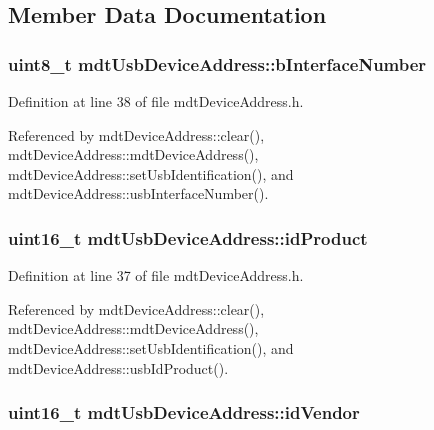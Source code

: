 \subsection{Member Data Documentation}
\hypertarget{structmdt_usb_device_address_ac599e57df4f2a44e8c62791d1e5e5600}{
\subsubsection[{b\-Interface\-Number}]{\setlength{\rightskip}{0pt plus 5cm}uint8\-\_\-t mdt\-Usb\-Device\-Address\-::b\-Interface\-Number}}\label{structmdt_usb_device_address_ac599e57df4f2a44e8c62791d1e5e5600}


Definition at line 38 of file mdt\-Device\-Address.\-h.



Referenced by mdt\-Device\-Address\-::clear(), mdt\-Device\-Address\-::mdt\-Device\-Address(), mdt\-Device\-Address\-::set\-Usb\-Identification(), and mdt\-Device\-Address\-::usb\-Interface\-Number().

\hypertarget{structmdt_usb_device_address_aade64f7cb76af63da7cb493cebd614f2}{
\subsubsection[{id\-Product}]{\setlength{\rightskip}{0pt plus 5cm}uint16\-\_\-t mdt\-Usb\-Device\-Address\-::id\-Product}}\label{structmdt_usb_device_address_aade64f7cb76af63da7cb493cebd614f2}


Definition at line 37 of file mdt\-Device\-Address.\-h.



Referenced by mdt\-Device\-Address\-::clear(), mdt\-Device\-Address\-::mdt\-Device\-Address(), mdt\-Device\-Address\-::set\-Usb\-Identification(), and mdt\-Device\-Address\-::usb\-Id\-Product().

\hypertarget{structmdt_usb_device_address_a7995bcabee1715f7e209edfc623f7a55}{
\subsubsection[{id\-Vendor}]{\setlength{\rightskip}{0pt plus 5cm}uint16\-\_\-t mdt\-Usb\-Device\-Address\-::id\-Vendor}}\label{structmdt_usb_device_address_a7995bcabee1715f7e209edfc623f7a55}


